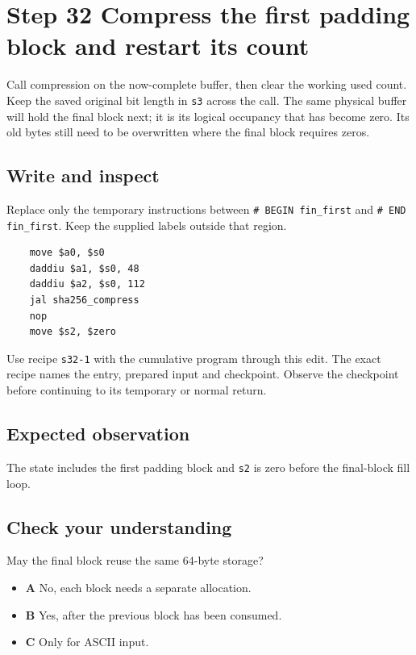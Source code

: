 \section{Step 32 Compress the first padding block and restart its count}\label{sha-s32}

Call compression on the now-complete buffer, then clear the working used count. Keep the saved original bit length in \texttt{s3} across the call. The same physical buffer will hold the final block next; it is its logical occupancy that has become zero. Its old bytes still need to be overwritten where the final block requires zeros.

\subsection{Write and inspect}
Replace only the temporary instructions between \texttt{\# BEGIN fin\_first} and \texttt{\# END fin\_first}. Keep the supplied labels outside that region.

\begin{verbatim}
    move $a0, $s0
    daddiu $a1, $s0, 48
    daddiu $a2, $s0, 112
    jal sha256_compress
    nop
    move $s2, $zero
\end{verbatim}

Use recipe \texttt{s32-1} with the cumulative program through this edit. The exact recipe names the entry, prepared input and checkpoint. Observe the checkpoint before continuing to its temporary or normal return.

\subsection{Expected observation}
The state includes the first padding block and \texttt{s2} is zero before the final-block fill loop.

\subsection{Check your understanding}
May the final block reuse the same 64-byte storage?

\begin{itemize}
  \item \textbf{A} No, each block needs a separate allocation.
  \item \textbf{B} Yes, after the previous block has been consumed.
  \item \textbf{C} Only for ASCII input.
\end{itemize}
